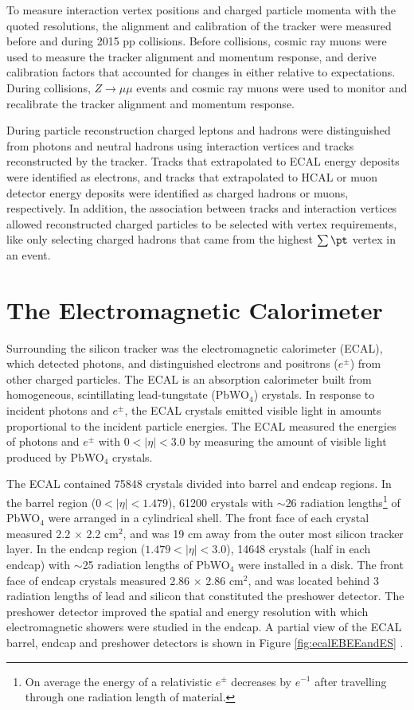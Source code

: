To measure interaction vertex positions and charged particle momenta with the quoted resolutions, the alignment and calibration 
of the tracker were measured before and during 2015 pp collisions.  Before collisions, cosmic ray muons were 
used to measure the tracker alignment and momentum response, and derive calibration factors that accounted for 
changes in either relative to expectations.  During collisions, $Z \rightarrow \mu\mu$ events and cosmic ray muons 
were used to monitor and recalibrate the tracker alignment and momentum response.

During particle reconstruction charged leptons and hadrons were distinguished from photons and neutral hadrons using 
interaction vertices and tracks reconstructed by the tracker.  Tracks that extrapolated to ECAL energy deposits were 
identified as electrons, and tracks that extrapolated to HCAL or muon detector energy deposits were identified as charged 
hadrons or muons, respectively.  In addition, the association between tracks and interaction vertices allowed reconstructed 
charged particles to be selected with vertex requirements, like only selecting charged hadrons that came from the highest 
$\sum \pt$ vertex in an event.


\section{The Electromagnetic Calorimeter}
\label{sec:ecalDescription}
Surrounding the silicon tracker was the electromagnetic calorimeter (ECAL), which detected photons, and distinguished
electrons and positrons ($e^{\pm}$) from other charged particles.  
The ECAL is an absorption calorimeter built from homogeneous, scintillating lead-tungstate (PbWO$_{4}$) crystals.  
In response to incident photons and $e^{\pm}$, the ECAL crystals emitted visible light in amounts proportional to 
the incident particle energies.  The ECAL measured the energies of photons and $e^{\pm}$ with $0 < |\eta| < 3.0$ by 
measuring the amount of visible light produced by PbWO$_{4}$ crystals.

The ECAL contained 75848 crystals \cite{ecalPerformanceInCollisions} divided into barrel and endcap regions.  In the 
barrel region ($0 < |\eta| < 1.479$), 61200 
crystals with $\sim$26 radiation lengths\footnote{On average the energy of a relativistic $e^{\pm}$ decreases by $e^{-1}$ after 
travelling through one radiation length of material.} of PbWO$_{4}$ were arranged in a cylindrical shell.  The front face of 
each crystal measured 2.2 $\times$ 2.2 cm$^{2}$, and was 19 cm away from the outer most silicon tracker layer.  
In the endcap region ($1.479 < |\eta| < 3.0$), 14648 crystals (half in each 
endcap) with $\sim$25 radiation lengths of PbWO$_{4}$ were installed in a disk.  The front face of endcap crystals measured 2.86 
$\times$ 2.86 cm$^{2}$, and was located behind 3 radiation lengths of lead and silicon that constituted the preshower detector.  
The preshower detector improved the spatial and energy resolution with which electromagnetic showers were studied in the 
endcap.  A partial view of the ECAL barrel, endcap and preshower detectors is shown in Figure \ref{fig:ecalEBEEandES} \cite{ecalTDR}.

